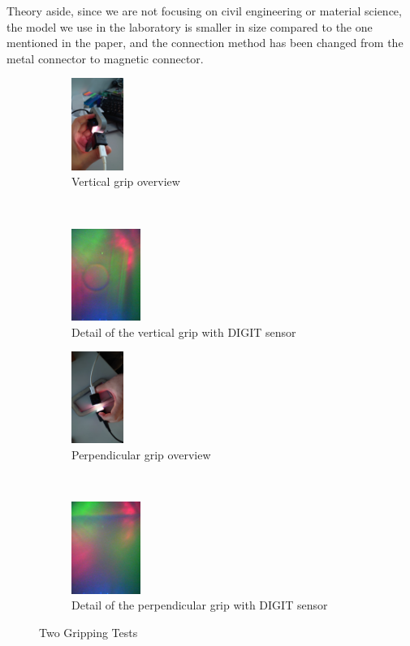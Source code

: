 Theory aside, since we are not focusing on civil engineering or material science, the model we use in the laboratory is smaller in size compared to the one mentioned in the paper, and the connection method has been changed from the metal connector to magnetic connector.

\begin{figure}[t]
	\centering
	\begin{subfigure}[t]{0.45\textwidth}
		\centering
		\includegraphics[height=3cm]{fig/vertical_overview.JPG} %
		\caption{Vertical grip overview}
	\end{subfigure}
	~ %
	\begin{subfigure}[t]{0.45\textwidth}
		\centering
		\includegraphics[height=3cm]{fig/vertical_digit.png} %
		\caption{Detail of the vertical grip with DIGIT sensor}
	\end{subfigure}
	\medskip %
	\begin{subfigure}[t]{0.45\textwidth}
		\centering
		\includegraphics[height=3cm]{fig/perpendicular_overview.JPG} %
		\caption{Perpendicular grip overview}
	\end{subfigure}
	~ %
	\begin{subfigure}[t]{0.45\textwidth}
		\centering
		\includegraphics[height=3cm]{fig/perpendicular_digit.png} %
		\caption{Detail of the perpendicular grip with DIGIT sensor}
	\end{subfigure}
	\caption{Two Gripping Tests}
	\label{fig:griptest}
\end{figure}

